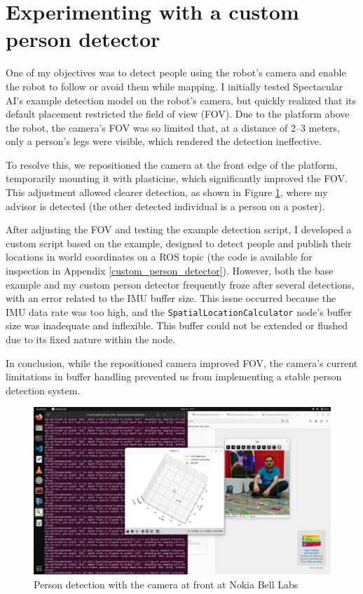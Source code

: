 \section{Experimenting with a custom person detector}

One of my objectives was to detect people using the robot's camera and enable the robot to follow or avoid them while mapping. I initially tested Spectacular AI’s example detection model on the robot’s camera, but quickly realized that its default placement restricted the field of view (FOV). Due to the platform above the robot, the camera’s FOV was so limited that, at a distance of 2–3 meters, only a person’s legs were visible, which rendered the detection ineffective.

To resolve this, we repositioned the camera at the front edge of the platform, temporarily mounting it with plasticine, which significantly improved the FOV. This adjustment allowed clearer detection, as shown in Figure \ref{fig:person_detection_camera_at_front_nokia}, where my advisor is detected (the other detected individual is a person on a poster).

After adjusting the FOV and testing the example detection script, I developed a custom script based on the example, designed to detect people and publish their locations in world coordinates on a ROS topic (the code is available for inspection in Appendix \ref{custom_person_detector}). However, both the base example and my custom person detector frequently froze after several detections, with an error related to the IMU buffer size. This issue occurred because the IMU data rate was too high, and the \verb|SpatialLocationCalculator| node’s buffer size was inadequate and inflexible. This buffer could not be extended or flushed due to its fixed nature within the node.

In conclusion, while the repositioned camera improved FOV, the camera's current limitations in buffer handling prevented us from implementing a stable person detection system.

\begin{figure}[htbp]
    \centering
    \includegraphics[width=150mm, keepaspectratio]{figures_jpg/person_detection_camera_at_front_nokia.jpg}
    \caption{Person detection with the camera at front at Nokia Bell Labs}
    \label{fig:person_detection_camera_at_front_nokia}
\end{figure}
